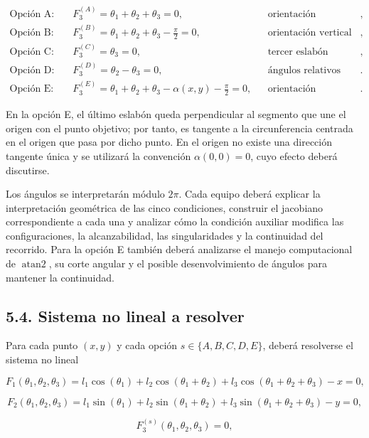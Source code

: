 \documentclass[12pt]{article}
\begin{document}
\begin{align*}
\text{Opción A:}\qquad &F_3^{(A)}=\theta_1+\theta_2+\theta_3=0,
&&\text{orientación horizontal del efector},\\[0.4em]
\text{Opción B:}\qquad &F_3^{(B)}=\theta_1+\theta_2+\theta_3-\frac{\pi}{2}=0,
&&\text{orientación vertical del efector},\\[0.4em]
\text{Opción C:}\qquad &F_3^{(C)}=\theta_3=0,
&&\text{tercer eslabón alineado con el segundo},\\[0.4em]
\text{Opción D:}\qquad &F_3^{(D)}=\theta_2-\theta_3=0,
&&\text{ángulos relativos segundo y tercero iguales}. \\[0.4em]
\text{Opción E:}\qquad
&F_3^{(E)}=\theta_1+\theta_2+\theta_3-\alpha(x,y)-\frac{\pi}{2}=0,
&& \text{orientación tangencial respecto del origen}.
\end{align*}

En la opción E, el último eslabón queda perpendicular al segmento que une el origen con el punto objetivo; por tanto, es tangente a la circunferencia centrada en el origen que pasa por dicho punto. En el origen no existe una dirección tangente única y se utilizará la convención \(\alpha(0,0)=0\), cuyo efecto deberá discutirse.

Los ángulos se interpretarán módulo \(2\pi\). Cada equipo deberá explicar la interpretación geométrica de las cinco condiciones, construir el jacobiano correspondiente a cada una y analizar cómo la condición auxiliar modifica las configuraciones, la alcanzabilidad, las singularidades y la continuidad del recorrido. Para la opción E también deberá analizarse el manejo computacional de \(\operatorname{atan2}\), su corte angular y el posible desenvolvimiento de ángulos para mantener la continuidad.

\subsection*{5.4. Sistema no lineal a resolver}

Para cada punto \((x,y)\) y cada opción \(s\in\{A,B,C,D,E\}\), deberá resolverse el sistema no lineal

\[
F_1(\theta_1,\theta_2,\theta_3)=
l_1\cos(\theta_1)+l_2\cos(\theta_1+\theta_2)+l_3\cos(\theta_1+\theta_2+\theta_3)-x=0,
\]

\[
F_2(\theta_1,\theta_2,\theta_3)=
l_1\sin(\theta_1)+l_2\sin(\theta_1+\theta_2)+l_3\sin(\theta_1+\theta_2+\theta_3)-y=0,
\]

\[
F_3^{(s)}(\theta_1,\theta_2,\theta_3)=0,
\]
\end{document}
